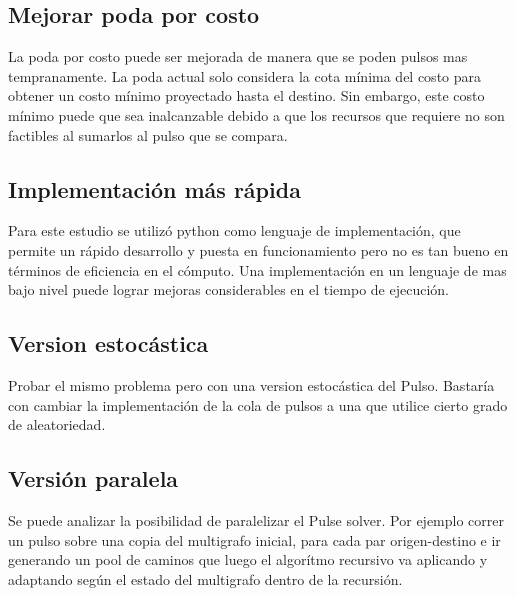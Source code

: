\documentclass{article}
\begin{document}
  \subsection*{Mejorar poda por costo}

  La poda por costo puede ser mejorada de manera que se poden pulsos mas tempranamente. La poda actual solo considera la cota mínima del costo para obtener un costo mínimo proyectado hasta el destino. Sin embargo, este costo mínimo puede que sea inalcanzable debido a que los recursos que requiere no son factibles al sumarlos al pulso que se compara.

  \subsection*{Implementación más rápida}

  Para este estudio se utilizó python como lenguaje de implementación, que permite un rápido desarrollo y puesta en funcionamiento pero no es tan bueno en términos de eficiencia en el cómputo. Una implementación en un lenguaje de mas bajo nivel puede lograr mejoras considerables en el tiempo de ejecución.

  \subsection*{Version estocástica}

  Probar el mismo problema pero con una version estocástica del Pulso. Bastaría con cambiar la implementación de la cola de pulsos a una que utilice cierto grado de aleatoriedad.

  \subsection*{Versión paralela}

  Se puede analizar la posibilidad de paralelizar el Pulse solver. Por ejemplo correr un pulso sobre una copia del multigrafo inicial, para cada par origen-destino e ir generando un pool de caminos que luego el algorítmo recursivo va aplicando y adaptando según el estado del multigrafo dentro de la recursión.
\end{document}
